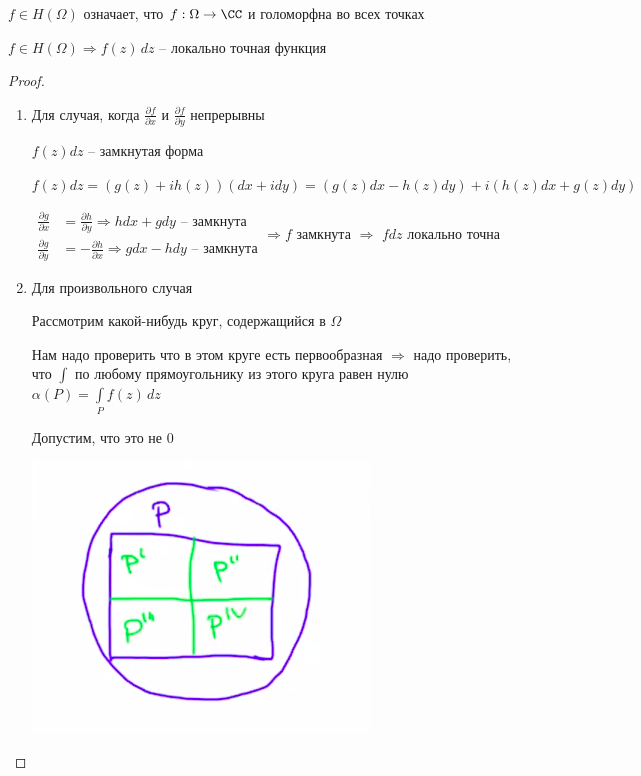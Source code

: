 
\begin{designations}
	$f\in H(\Omega)$ означает, что $f:\Omega \to \CC$ и голоморфна во всех точках
\end{designations}

\begin{theorem}[Коши]\thmslashn
	
	$f\in H(\Omega) \Rightarrow f(z)\,dz$ -- локально точная функция
	
\end{theorem}

\begin{proof}\thmslashn

	\begin{enumerate}
		\item 
		Для случая, когда $\frac{\partial f}{\partial x}$ и $\frac{\partial f}{\partial y}$ непрерывны
		
		$f(z)dz$ -- замкнутая форма
		
		$f(z)dz = (g(z) + ih(z))(dx + idy) = (g(z)dx - h(z)dy) + i(h(z)dx + g(z)dy)$
		
		$
		\begin{aligned}
		\frac{\partial g}{\partial x} &= \frac{\partial h}{\partial y} \Rightarrow hdx + gdy\text{ -- замкнута}\\
		\frac{\partial g}{\partial y} &= -\frac{\partial h}{\partial x} \Rightarrow gdx - hdy\text{ -- замкнута}
		\end{aligned} \Rightarrow f$ замкнута $\Rightarrow$ $fdz$ локально точна
	
		\item
		Для произвольного случая
		
		Рассмотрим какой-нибудь круг, содержащийся в $\Omega$ 
		
		Нам надо проверить что в этом круге есть первообразная $\Rightarrow$ надо проверить, что $\int$ по любому прямоугольнику из этого круга равен нулю $\alpha(P) = \int\limits_{P} f(z)\,dz$ 
		
		Допустим, что это не $0$
		
		\includegraphics[scale=0.5]{pic_1}
		

\end{enumerate}
\end{proof}

